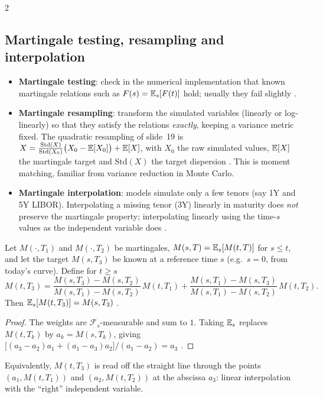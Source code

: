 \begin{paracol}{2}
\subsection{Martingale testing, resampling and interpolation}
\begin{itemize}
  \item \textbf{Martingale testing}: check in the numerical implementation that known martingale relations such as
        $F(s)=\mathbb{E}_s[F(t)]$ hold; usually they fail slightly .
  \item \textbf{Martingale resampling}: transform the simulated variables (linearly or log-linearly) so that they
        satisfy the relations \emph{exactly}, keeping a variance metric fixed. The quadratic resampling of slide~19
        is $X=\frac{\mathrm{Std}(X)}{\mathrm{Std}(X_0)}\bigl(X_0-\mathbb{E}[X_0]\bigr)+\mathbb{E}[X]$, with $X_0$ the raw simulated values,
        $\mathbb{E}[X]$ the martingale target and $\mathrm{Std}(X)$ the target dispersion . This is moment
        matching, familiar from variance reduction in Monte Carlo.
  \item \textbf{Martingale interpolation}: models simulate only a few tenors (say 1Y and 5Y LIBOR). Interpolating a
        missing tenor (3Y) linearly in maturity does \emph{not} preserve the martingale property; interpolating
        linearly using the time-$s$ values as the independent variable does .
\end{itemize}

\begin{proposition}\label{ch08:prop-mginterp}
Let $M(\cdot,T_1)$ and $M(\cdot,T_2)$ be martingales, $M(s,T)=\mathbb{E}_s[M(t,T)]$ for $s\le t$, and let the target
$M(s,T_3)$ be known at a reference time $s$ (e.g.\ $s=0$, from today's curve). Define for $t\ge s$
\[
  M(t,T_3)=\frac{M(s,T_3)-M(s,T_2)}{M(s,T_1)-M(s,T_2)}\,M(t,T_1)+\frac{M(s,T_1)-M(s,T_3)}{M(s,T_1)-M(s,T_2)}\,M(t,T_2).
\]
Then $\mathbb{E}_s[M(t,T_3)]=M(s,T_3)$ .
\end{proposition}
\begin{proof}
The weights are $\mathcal F_s$-measurable and sum to $1$. Taking $\mathbb{E}_s$ replaces $M(t,T_k)$ by $a_k=M(s,T_k)$, giving
$\bigl[(a_3-a_2)a_1+(a_1-a_3)a_2\bigr]/(a_1-a_2)=a_3$ .
\end{proof}
Equivalently, $M(t,T_3)$ is read off the straight line through the points $(a_1,M(t,T_1))$ and $(a_2,M(t,T_2))$ at the
abscissa $a_3$: linear interpolation with the ``right'' independent variable.


\end{paracol}
